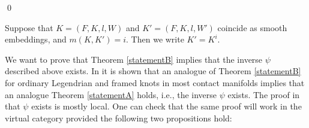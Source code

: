 \qed

Suppose that $K=(F,K,l,W)$ and $K'=(F,K,l,W')$ coincide as smooth embeddings, and $m(K,K')=i$.  Then we write $K'=K^i$.


We want to prove that Theorem \ref{statementB} implies that the inverse $\psi$ described above exists. In \cite{Chernov} it is  shown that an analogue of Theorem \ref{statementB} for ordinary Legendrian and framed knots in most contact manifolds implies that an analogue Theorem \ref{statementA} holds, i.e., the inverse $\psi$ exists. The proof in \cite{Chernov} that $\psi$ exists is mostly local.  One can check that the same proof will work in the virtual category provided the following two propositions hold:


